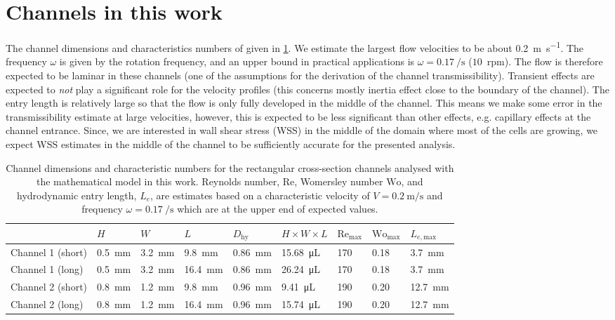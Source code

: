 \documentclass{article}
\begin{document}
\section{Channels in this work}
The channel dimensions and characteristics numbers of given in \cref{tab:val}. We estimate the largest flow velocities to be about \SI{0.2}{\m\per\s}. The frequency $\omega$ is given by the rotation frequency, and an upper bound in practical applications is $\omega = \SI{0.17}{\per\s}$ ($10$~rpm). The flow is therefore expected to be laminar in these channels (one of the assumptions for the derivation of the channel transmissibility). Transient effects are expected to \emph{not} play a significant role for the velocity profiles (this concerns mostly inertia effect close to the boundary of the channel). The entry length is relatively large so that the flow is only fully developed in the middle of the channel. This means we make some error in the transmissibility estimate at large velocities, however, this is expected to be less significant than other effects, e.g. capillary effects at the channel entrance. Since, we are interested in wall shear stress (WSS) in the middle of the domain where most of the cells are growing, we expect WSS estimates in the middle of the channel to be sufficiently accurate for the presented analysis.
\begin{table}[!htb]
\caption{Channel dimensions and characteristic numbers for the rectangular cross-section channels analysed with the mathematical model in this work. Reynolds number, $\text{Re}$, Womersley number $\text{Wo}$, and hydrodynamic entry length, $L_e$, are estimates based on a characteristic velocity of $V = \SI{0.2}{\m\per\s}$ and frequency $\omega = \SI{0.17}{\per\s}$ which are at the upper end of expected values.}
\centering
\begin{tabular}{lllllllll}
\toprule
                             & $H$ & $W$ & $L$ & $D_\text{hy}$ & $H\times W\times L$ & $\text{Re}_\text{max}$  & $\text{Wo}_\text{max}$ & $L_{e,\text{max}}$ \\\midrule
    Channel 1 (short) & \SI{0.5}{\milli\m} & \SI{3.2}{\milli\m} & \SI{9.8}{\milli\m}  & \SI{0.86}{\milli\m} & \SI{15.68}{\micro\liter} & 170 & 0.18 & \SI{3.7}{\milli\m} \\
    Channel 1 (long) & \SI{0.5}{\milli\m} & \SI{3.2}{\milli\m} & \SI{16.4}{\milli\m} & \SI{0.86}{\milli\m} & \SI{26.24}{\micro\liter} & 170 & 0.18 & \SI{3.7}{\milli\m}\\\midrule
    Channel 2 (short) & \SI{0.8}{\milli\m} & \SI{1.2}{\milli\m} & \SI{9.8}{\milli\m} & \SI{0.96}{\milli\m} & \SI{9.41}{\micro\liter} & 190 & 0.20 & \SI{12.7}{\milli\m}\\
    Channel 2 (long) & \SI{0.8}{\milli\m} & \SI{1.2}{\milli\m} & \SI{16.4}{\milli\m} & \SI{0.96}{\milli\m} & \SI{15.74}{\micro\liter} & 190 & 0.20 & \SI{12.7}{\milli\m} \\\bottomrule
\end{tabular}
\label{tab:val}
\end{table}
\end{document}
